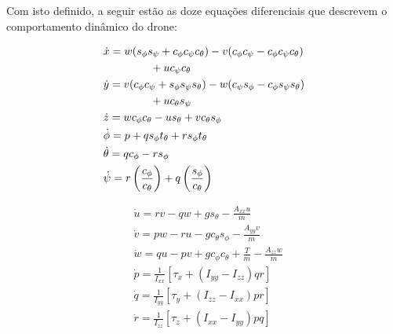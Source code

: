 \vspace{-1.5cm}

Com isto definido, a seguir estão as doze equações diferenciais que descrevem o comportamento dinâmico do drone:

\vspace{+0.5cm}

\begin{minipage}{0.5\textwidth}
    \begin{equation*}
        \begin{aligned}
            &\dot{{x}} = {w}({s_{\phi}s_{\psi}} + {c_{\phi}c_{\psi}c_{\theta}}) - {v}({c_{\phi}c_{\psi}} - {c_{\phi}c_{\psi}c_{\theta}}) \\
            &\hspace{1.5cm} + {uc_{\psi}c_{\theta}}\\
            &\dot{{y}} = {v}({c_{\phi}c_{\psi}} + {s_{\phi}s_{\psi}s_{\theta}}) - {w}({c_{\psi}s_{\phi}} - {c_{\phi}s_{\psi}s_{\theta}}) \\
            &\hspace{1.5cm} + {uc_{\theta}s_{\psi}}\\
            &\dot{{z}} = {wc_{\phi}c_{\theta}} - {us_{\theta}} + {vc_{\theta}s_{\phi}}\\
            &\dot{{\phi}} = {p} + {qs_{\phi}t_{\theta}} + {rs_{\phi}t_{\theta}}\\
            &\dot{{\theta}} = {qc_{\phi}} - {rs_{\phi}}\\
            &\dot{{\psi}} = {r\left(\frac{c_{\phi}}{c_{\theta}}\right)} + {q\left(\frac{s_{\phi}}{c_{\theta}}\right)}
        \end{aligned}
    \end{equation*}
\end{minipage}
\hfill
\begin{minipage}{0.45\textwidth}
    \begin{equation*}
        \begin{aligned}
            &\dot{{u}} = {rv} - {qw} + {gs_{\theta}} - \frac{{A_{xx}}{u}}{{m}}\\
            &\dot{{v}} = {pw} - {ru} - {gc_{\theta}s_{\phi}} - \frac{{A_{yy}}{v}}{{m}}\\
            &\dot{{w}} = {qu} - {pv} + {gc_{\phi}c_{\theta}} + {\frac{T}{m}} - \frac{{A_{zz}}{w}}{{m}}\\
            &\dot{{p}} = {\frac{1}{I_{xx}}\left[{\tau_x + (I_{yy} - I_{zz})qr}\right]}\\
            &\dot{{q}} = {\frac{1}{I_{yy}}\left[{\tau_y + (I_{zz} - I_{xx})pr}\right]}\\
            &\dot{{r}} = {\frac{1}{I_{zz}}\left[{\tau_z + (I_{xx} - I_{yy})pq}\right]}
        \end{aligned}
    \end{equation*}
\end{minipage}


